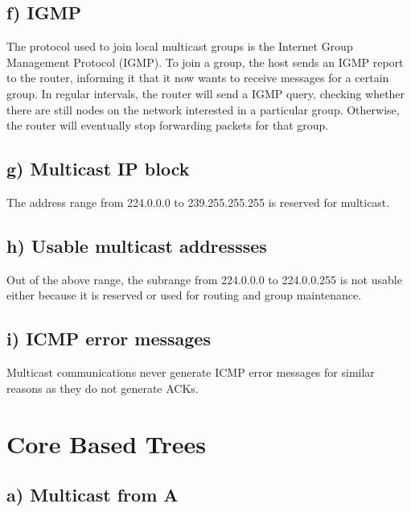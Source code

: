 \documentclass[a4paper, 11 pt, article, accentcolor=tud7b]{tudreport}
\begin{document}
	\subsection*{f) IGMP}
	The protocol used to join local multicast groups is the Internet Group Management Protocol (IGMP). To join a group, the host sends an IGMP report to the router, informing it that it now wants to receive messages for a certain group. In regular intervals, the router will send a IGMP query, checking whether there are still nodes on the network interested in a particular group. Otherwise, the router will eventually stop forwarding packets for that group.
	
	\subsection*{g) Multicast IP block}
	The address range from 224.0.0.0 to 239.255.255.255 is reserved for multicast.
	
	\subsection*{h) Usable multicast addressses}
	Out of the above range, the subrange from 224.0.0.0 to 224.0.0.255 is not usable either because it is reserved or used for routing and group maintenance.
	
	\subsection*{i) ICMP error messages}
	Multicast communications never generate ICMP error messages for similar reasons as they do not generate ACKs.
	
	\section{Core Based Trees}
	
	\subsection*{a) Multicast from A}
	
\end{document}
